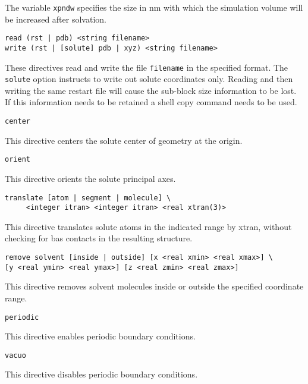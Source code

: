 The variable \verb+xpndw+ specifies the size in nm with which the simulation
volume will be increased after solvation.

\begin{verbatim}
read (rst | pdb) <string filename>
write (rst | [solute] pdb | xyz) <string filename>
\end{verbatim}

These directives read and write the file \verb+filename+ in the specified
format. The \verb+solute+ option instructs to write out solute coordinates
only. Reading and then writing the same restart file will cause the
sub-block size information to be lost. If this information needs to be
retained a shell copy command needs to be used.

\begin{verbatim}
center
\end{verbatim}

This directive centers the solute center of geometry at the origin.

\begin{verbatim}
orient
\end{verbatim}

This directive orients the solute principal axes.

\begin{verbatim}
translate [atom | segment | molecule] \
	 <integer itran> <integer itran> <real xtran(3)>
\end{verbatim}

This directive translates solute atoms in the indicated range by xtran,
without checking for bas contacts in the resulting structure.

\begin{verbatim}
remove solvent [inside | outside] [x <real xmin> <real xmax>] \
[y <real ymin> <real ymax>] [z <real zmin> <real zmax>]
\end{verbatim}

This directive removes solvent molecules inside or outside the
specified coordinate range.

\begin{verbatim}
periodic
\end{verbatim}

This directive enables periodic boundary conditions.

\begin{verbatim}
vacuo
\end{verbatim}

This directive disables periodic boundary conditions.

